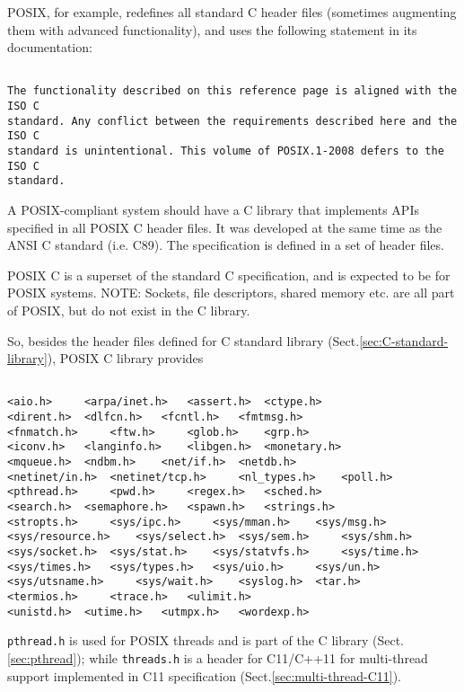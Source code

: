 \begin{mdframed}

POSIX, for example, redefines all standard C header files (sometimes augmenting
them with advanced functionality), and uses the following statement in its
documentation:
\begin{verbatim}

The functionality described on this reference page is aligned with the ISO C
standard. Any conflict between the requirements described here and the ISO C
standard is unintentional. This volume of POSIX.1-2008 defers to the ISO C
standard.
\end{verbatim}


A POSIX-compliant system should have a C library that implements
APIs specified in all POSIX C header files. It was developed at the same time as
the ANSI C standard (i.e. C89).
The specification is defined in a set of header files.

\end{mdframed}


POSIX C is a superset of the standard C specification, and is expected to be for
POSIX systems. NOTE: Sockets, file descriptors, shared memory etc. are all part
of POSIX, but do not exist in the C library.

So, besides the header files defined for C standard library
(Sect.\ref{sec:C-standard-library}), POSIX C library provides
\begin{verbatim}

<aio.h> 	<arpa/inet.h> 	<assert.h> 	<ctype.h>
<dirent.h> 	<dlfcn.h> 	<fcntl.h> 	<fmtmsg.h>
<fnmatch.h> 	<ftw.h> 	<glob.h> 	<grp.h>
<iconv.h> 	<langinfo.h> 	<libgen.h> 	<monetary.h>
<mqueue.h> 	<ndbm.h> 	<net/if.h> 	<netdb.h>
<netinet/in.h> 	<netinet/tcp.h> 	<nl_types.h> 	<poll.h>
<pthread.h> 	<pwd.h> 	<regex.h> 	<sched.h>
<search.h> 	<semaphore.h> 	<spawn.h> 	<strings.h>
<stropts.h> 	<sys/ipc.h> 	<sys/mman.h> 	<sys/msg.h>
<sys/resource.h> 	<sys/select.h> 	<sys/sem.h> 	<sys/shm.h>
<sys/socket.h> 	<sys/stat.h> 	<sys/statvfs.h> 	<sys/time.h>
<sys/times.h> 	<sys/types.h> 	<sys/uio.h> 	<sys/un.h>
<sys/utsname.h> 	<sys/wait.h> 	<syslog.h> 	<tar.h>
<termios.h> 	<trace.h> 	<ulimit.h>
<unistd.h> 	<utime.h> 	<utmpx.h> 	<wordexp.h>
\end{verbatim}


\verb!pthread.h! is used for POSIX threads 
and is part of the C library (Sect.\ref{sec:pthread}); while \verb!threads.h!
is a header for C11/C++11 for multi-thread support implemented in C11
specification (Sect.\ref{sec:multi-thread-C11}).

